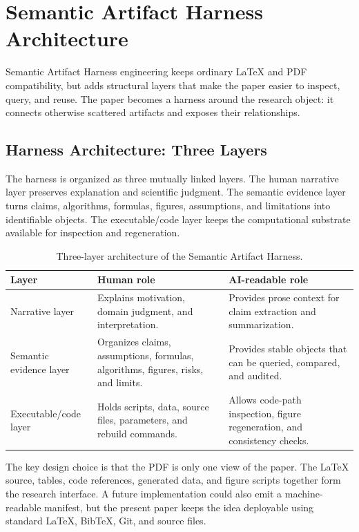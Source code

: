 \documentclass{article}
\begin{document}
\section{Semantic Artifact Harness Architecture}

Semantic Artifact Harness engineering keeps ordinary LaTeX and PDF compatibility, but adds structural layers that make the paper easier to inspect, query, and reuse. The paper becomes a harness around the research object: it connects otherwise scattered artifacts and exposes their relationships.

\subsection{Harness Architecture: Three Layers}

The harness is organized as three mutually linked layers. The human narrative layer preserves explanation and scientific judgment. The semantic evidence layer turns claims, algorithms, formulas, figures, assumptions, and limitations into identifiable objects. The executable/code layer keeps the computational substrate available for inspection and regeneration.

\begin{table}[t]
\caption{Three-layer architecture of the Semantic Artifact Harness.}
\centering
\small
\begin{tabular}{p{3.2cm}p{4.8cm}p{5.1cm}}
\toprule
\textbf{Layer} & \textbf{Human role} & \textbf{AI-readable role} \\
\midrule
Narrative layer & Explains motivation, domain judgment, and interpretation. & Provides prose context for claim extraction and summarization. \\
Semantic evidence layer & Organizes claims, assumptions, formulas, algorithms, figures, risks, and limits. & Provides stable objects that can be queried, compared, and audited. \\
Executable/code layer & Holds scripts, data, source files, parameters, and rebuild commands. & Allows code-path inspection, figure regeneration, and consistency checks. \\
\bottomrule
\end{tabular}
\label{tab:layers}
\end{table}

The key design choice is that the PDF is only one view of the paper. The LaTeX source, tables, code references, generated data, and figure scripts together form the research interface. A future implementation could also emit a machine-readable manifest, but the present paper keeps the idea deployable using standard LaTeX, BibTeX, Git, and source files.
\end{document}
